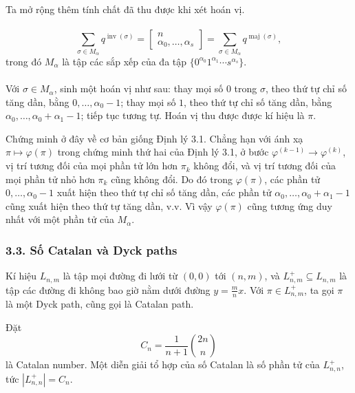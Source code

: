 \documentclass[11pt]{article}
\begin{document}
Ta mở rộng thêm tính chất đã thu được khi xét hoán vị.

\paragraph{}
\[
  \sum_{\sigma\in M_\alpha}q^{\operatorname{inv}(\sigma)}
  =
  \left[\begin{matrix} n\\ \alpha_0,\ldots,\alpha_s\end{matrix}\right]
  =
  \sum_{\sigma\in M_\alpha}q^{\operatorname{maj}(\sigma)},
\]
trong đó \(M_\alpha\) là tập các sắp xếp của đa tập
\(\{0^{\alpha_0}1^{\alpha_1}\cdots s^{\alpha_s}\}\).

\paragraph{}
Với \(\sigma\in M_\alpha\), sinh một hoán vị như sau: thay mọi số \(0\) trong
\(\sigma\), theo thứ tự chỉ số tăng dần, bằng
\(0,\ldots,\alpha_0-1\); thay mọi số \(1\), theo thứ tự chỉ số tăng dần, bằng
\(\alpha_0,\ldots,\alpha_0+\alpha_1-1\); tiếp tục tương tự. Hoán vị thu được
được kí hiệu là \(\pi\).

Chứng minh ở đây về cơ bản giống Định lý 3.1. Chẳng hạn với ánh xạ
\(\pi\mapsto\varphi(\pi)\) trong chứng minh thứ hai của Định lý 3.1, ở bước
\(\varphi^{(k-1)}\to\varphi^{(k)}\), vị trí tương đối của mọi phần tử lớn hơn
\(\pi_k\) không đổi, và vị trí tương đối của mọi phần tử nhỏ hơn \(\pi_k\) cũng
không đổi. Do đó trong \(\varphi(\pi)\), các phần tử
\(0,\ldots,\alpha_0-1\) xuất hiện theo thứ tự chỉ số tăng dần, các phần tử
\(\alpha_0,\ldots,\alpha_0+\alpha_1-1\) cũng xuất hiện theo thứ tự tăng dần,
v.v. Vì vậy \(\varphi(\pi)\) cũng tương ứng duy nhất với một phần tử của
\(M_\alpha\).

\subsubsection*{3.3. Số Catalan và Dyck paths}

Kí hiệu \(L_{n,m}\) là tập mọi đường đi lưới từ \((0,0)\) tới \((n,m)\), và
\(L^+_{n,m}\subseteq L_{n,m}\) là tập các đường đi không bao giờ nằm dưới đường
\(y=\frac mn x\). Với \(\pi\in L^+_{n,m}\), ta gọi \(\pi\) là một Dyck path,
cũng gọi là Catalan path.

Đặt
\[
  C_n=\frac{1}{n+1}\binom{2n}{n}
\]
là Catalan number. Một diễn giải tổ hợp của số Catalan là số phần tử của
\(L^+_{n,n}\), tức \(|L^+_{n,n}|=C_n\).
\end{document}
